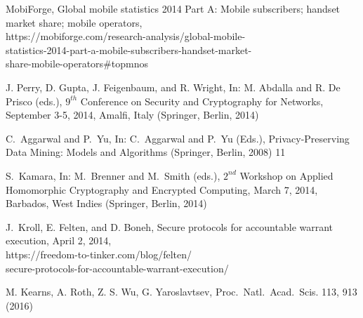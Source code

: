 \documentclass[USenglish,oneside,twocolumn]{article}
\begin{document}
\begin{thebibliography}{99}
 MobiForge, Global mobile statistics 2014 Part A: 
Mobile subscribers; handset market share; mobile operators,\\ 
https://mobiforge.com/research-analysis/global-mobile-\\
statistics-2014-part-a-mobile-subscribers-handset-market-\\
share-mobile-operators\#topmnos

 J. Perry, D. Gupta, J. Feigenbaum, and R. Wright,
In: M. Abdalla and R. De Prisco (eds.), $9^{th}$ Conference on Security and 
Cryptography for Networks, September 3-5, 2014, Amalfi, Italy (Springer,
Berlin, 2014)

 C.~Aggarwal and P.~Yu, In: C.~Aggarwal and P.~Yu (Eds.), 
Privacy-Preserving Data Mining: Models and Algorithms 
(Springer, Berlin, 2008) 11

 S.~Kamara, In: M.~Brenner and M.~Smith (eds.), 
$2^{nd}$ Workshop on Applied Homomorphic Cryptography and Encrypted Computing, 
March 7, 2014, Barbados, West Indies (Springer, Berlin, 2014)

 J.~Kroll, E. Felten, and D. Boneh, Secure protocols for
accountable warrant execution, April 2, 2014,\\
https://freedom-to-tinker.com/blog/felten/\\
secure-protocols-for-accountable-warrant-execution/

 M. Kearns, A. Roth, Z. S. Wu, G. Yaroslavtsev, 
Proc.~Natl.~Acad.~Scis. 113, 913 (2016)

\end{thebibliography}
\end{document}
